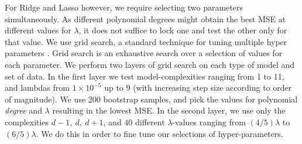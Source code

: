 For Ridge and Lasso however, we require selecting two parameters simultaneously. As different polynomial degrees might obtain the best MSE at different values for $\lambda$, it does not suffice to lock one and test the other only for that value. 
We use grid search, a standard technique for tuning multiple hyper parameters \citep[p. 302]{grid_search}.
Grid search is an exhaustive search over a selection of values for each parameter. 
We perform two layers of grid search on each type of model and set of data. 
In the first layer we test model-complexities ranging from 1 to 11, and lambdas from $1\times10^{-5}$ up to $9$ (with increasing step size according to order of magnitude). 
We use 200 bootstrap samples, and pick the values for polynomial \textit{degree} and $\lambda$ resulting in the lowest MSE. 
In the second layer, we use only the complexities $d-1,\ d,\ d+1$, and 40 different $\lambda$-values ranging from $(4/5)\lambda$ to $(6/5)\lambda$. 
We do this in order to fine tune our selections of hyper-parameters.
